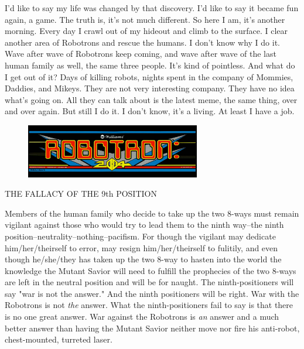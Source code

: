 \documentclass{amsbook}
\begin{document}
I'd like to say my life was changed by that discovery.  I'd like to say it became fun again, a game.  The truth is, it's not much different.  So here I am, it's another morning.  Every day I crawl out of my hideout and climb to the surface.  I clear another area of Robotrons and rescue the humans.  I don't know why I do it.  Wave after wave of Robotrons keep coming, and wave after wave of the last human family as well, the same three people.  It's kind of pointless.  And what do I get out of it?  Days of killing robots, nights spent in the company of Mommies, Daddies, and Mikeys.  They are not very interesting company.  They have no idea what's going on.  All they can talk about is the latest meme, the same thing, over and over again.  But still I do it.  I don't know, it's a living.  At least I have a job.
\clearpage

% 

\begin{figure}
  \includegraphics[width=3in]{robotron-2084_marquee.jpg}
\end{figure}
{\ROBOFONTy THE FALLACY OF THE 9th POSITION}

Members of the human family who decide to take up the two 8-ways must
remain vigilant against those who would try to lead them to the ninth
way--the ninth position--neutrality--nothing--pacifism. For though the
vigilant may dedicate him/her/theirself to error, may resign
him/her/theirself to fulitily, and even though he/she/they has taken
up the two 8-way to hasten into the world the knowledge the Mutant
Savior will need to fulfill the prophecies of the two 8-ways are left
in the neutral position and will be for naught. The ninth-positioners
will say "war is not the answer." And the ninth positioners will be
right. War with the Robotrons is not {\em the} answer. What the
ninth-positioners fail to say is that there is no one great answer.
War against the Robotrons is {\em an} answer and a much better answer
than having the Mutant Savior neither move nor fire his anti-robot,
chest-mounted, turreted laser.
\end{document}
